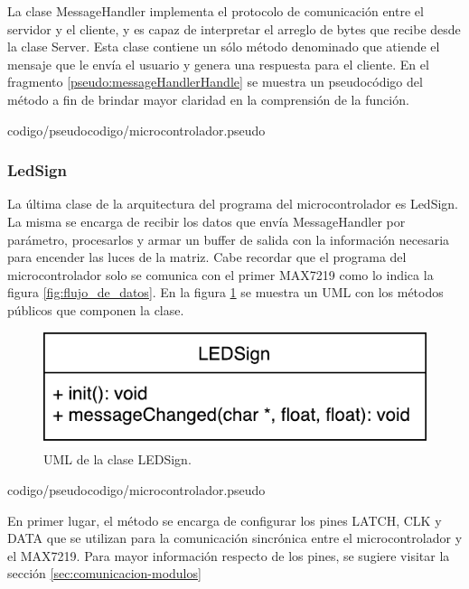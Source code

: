 La clase MessageHandler implementa el protocolo de comunicación entre el servidor y el cliente, y es capaz de interpretar el arreglo de bytes que recibe desde la clase Server.
Esta clase contiene un sólo método denominado  que atiende el mensaje que le envía el usuario y genera una respuesta para el cliente.
En el fragmento \ref{pseudo:messageHandlerHandle} se muestra un pseudocódigo del método a fin de brindar mayor claridad en la comprensión de la función.

 {codigo/pseudocodigo/microcontrolador.pseudo}



\subsubsection{LedSign}

La última clase de la arquitectura del programa del microcontrolador es LedSign.
La misma se encarga de recibir los datos que envía MessageHandler por parámetro, procesarlos y armar un buffer de salida con la información necesaria para encender las luces de la matriz.
Cabe recordar que el programa del microcontrolador solo se comunica con el primer MAX7219 como lo indica la figura \ref{fig:flujo_de_datos}.
En la figura \ref{uml:ledSign} se muestra un UML con los métodos públicos que componen la clase.

\begin{figure}[!ht]
	\centering
	\includegraphics[scale=0.8]{imagenes/uml/LEDSign.pdf}
	\caption{UML de la clase LEDSign.}
	\label{uml:ledSign}
\end{figure}

 {codigo/pseudocodigo/microcontrolador.pseudo}

En primer lugar, el método  se encarga de configurar los pines LATCH, CLK y DATA que se utilizan para la comunicación sincrónica entre el microcontrolador y el MAX7219.
Para mayor información respecto de los pines, se sugiere visitar la sección \ref{sec:comunicacion-modulos}


